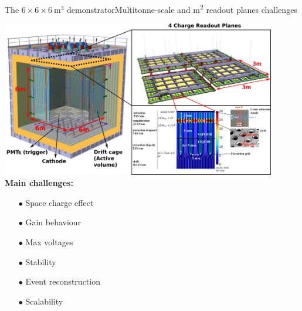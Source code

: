 \documentclass[10pt]{beamer}
\begin{document}
    \begin{frame}{The \texorpdfstring{$6 \times 6 \times \SI{6}{\meter\cubed}$}{666}
    		demonstrator}{Multitonne-scale and \si{\meter\squared} readout planes challenges}
    	\begin{scriptsize}
    			\includegraphics[width=0.9\textwidth]{figures/666/666_full.png}\\
    			\vfill
    			\textbf{Main challenges:}\\
    			\begin{minipage}{0.32\textwidth}
    				\begin{itemize}
    					\item[$\bullet$] Space charge effect
    					\item[$\bullet$] Gain behaviour
    				\end{itemize}
    			\end{minipage}\hfill
    			\begin{minipage}{0.32\textwidth}
    				\begin{itemize}
    					\item[$\bullet$] Max voltages
    					\item[$\bullet$] Stability
    				\end{itemize}
	    		\end{minipage}\hfill
	    		\begin{minipage}{0.32\textwidth}
	    			\begin{itemize}
	    				\item[$\bullet$] Event reconstruction
	    				\item[$\bullet$] Scalability
	    			\end{itemize}
	    		\end{minipage}
    	\end{scriptsize} 
    \end{frame}
    
\end{document}
